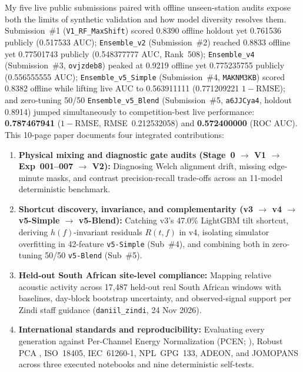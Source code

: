 \documentclass[10pt,a4paper]{article}
\begin{document}
My five live public submissions paired with offline unseen-station audits expose both the limits of synthetic validation and how model diversity resolves them. Submission~\#1 (\texttt{V1\_RF\_MaxShift}) scored 0.8390 offline holdout yet 0.761536 publicly (0.517533 AUC); \texttt{Ensemble\_v2} (Submission~\#2) reached 0.8833 offline yet 0.77501743 publicly (0.548377777 AUC, Rank~508); \texttt{Ensemble\_v4} (Submission~\#3, \texttt{ovjzdeb8}) peaked at 0.9219 offline yet 0.775235755 publicly (0.556555555 AUC); \texttt{Ensemble\_v5\_Simple} (Submission~\#4, \texttt{MAKNM3KB}) scored 0.8382 offline while lifting live AUC to 0.563911111 (0.771209221 $1-\mathrm{RMSE}$); and zero-tuning 50/50 \texttt{Ensemble\_v5\_Blend} (Submission~\#5, \texttt{a6JJCya4}, holdout 0.8914) jumped simultaneously to competition-best live performance: \textbf{0.787467941} ($1-\mathrm{RMSE}$, RMSE~0.212532058) and \textbf{0.572400000} (ROC AUC). This 10-page paper documents four integrated contributions:
\begin{enumerate}
    \item \textbf{Physical mixing and diagnostic gate audits (Stage~0 \texorpdfstring{$\to$}{to} V1 \texorpdfstring{$\to$}{to} Exp~001--007 \texorpdfstring{$\to$}{to} V2):} Diagnosing Welch alignment drift, missing edge-minute masks, and contrast precision-recall trade-offs across an 11-model deterministic benchmark.
    \item \textbf{Shortcut discovery, invariance, and complementarity (v3 \texorpdfstring{$\to$}{to} v4 \texorpdfstring{$\to$}{to} v5-Simple \texorpdfstring{$\to$}{to} v5-Blend):} Catching v3's 47.0\% LightGBM tilt shortcut, deriving $h(f)$-invariant residuals $R(t,f)$ in v4, isolating simulator overfitting in 42-feature \texttt{v5-Simple} (Sub~\#4), and combining both in zero-tuning 50/50 \texttt{v5-Blend} (Sub~\#5).
    \item \textbf{Held-out South African site-level compliance:} Mapping relative acoustic activity across 17,487 held-out real South African windows with baselines, day-block bootstrap uncertainty, and observed-signal support per Zindi staff guidance (\texttt{daniil\_zindi}, 24 Nov 2026).
    \item \textbf{International standards and reproducibility:} Evaluating every generation against Per-Channel Energy Normalization (PCEN; \citealp{wang2017pcen,lostanlen2019pcen}), Robust PCA \parencite{candes2011rpca,lin2017rpca}, ISO~18405, IEC~61260-1, NPL~GPG~133, ADEON, and JOMOPANS across three executed notebooks and nine deterministic self-tests.
\end{enumerate}
\end{document}
